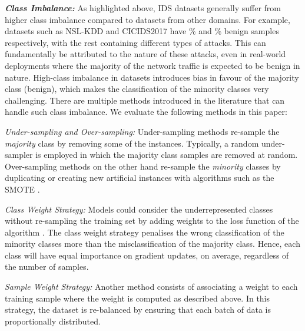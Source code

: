 \documentclass[runningheads]{llncs}
\begin{document}
\textbf{\textit{Class Imbalance:}}
As highlighted above, \ac{IDS} datasets generally suffer from higher class imbalance compared to datasets from other domains.
For example, datasets such as NSL-KDD and CICIDS2017 have \% and \% benign samples respectively, with the rest containing different types of attacks.
This can fundamentally be attributed to the nature of these attacks, even in real-world deployments where the majority of the network traffic is expected to be benign in nature.
High-class imbalance in datasets introduces bias in favour of the majority class (benign), which makes the classification of the minority classes very challenging. There are multiple methods introduced in the literature that can handle such class imbalance. We evaluate the following methods in this paper: 

\textit{Under-sampling and Over-sampling:}
Under-sampling methods re-sample the \emph{majority} class by removing some of the instances.
Typically, a random under-sampler is employed in which the majority class samples are removed at random.
Over-sampling methods on the other hand re-sample the \emph{minority} classes by duplicating or creating new artificial instances with algorithms such as the \ac{SMOTE} \cite{SMOTE}.

\textit{Class Weight Strategy:}
Models could consider the underrepresented classes without re-sampling the training set by adding weights to the loss function of the algorithm \cite{ClassWeight}. The class weight strategy penalises the wrong classification of the minority classes more than the misclassification of the majority class. Hence, each class will have equal importance on gradient updates, on average, regardless of the number of samples. 

\textit{Sample Weight Strategy:}
Another method consists of associating a weight to each training sample where the weight is computed as described above. In this strategy, the dataset is re-balanced by ensuring that each batch of data is proportionally distributed.
\end{document}
